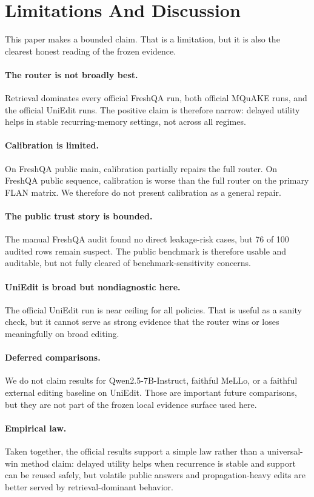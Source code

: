 \section{Limitations And Discussion}

This paper makes a bounded claim. That is a limitation, but it is also the clearest honest reading of the frozen evidence.

\paragraph{The router is not broadly best.}
Retrieval dominates every official FreshQA run, both official MQuAKE runs, and the official UniEdit runs. The positive claim is therefore narrow: delayed utility helps in stable recurring-memory settings, not across all regimes.

\paragraph{Calibration is limited.}
On FreshQA public main, calibration partially repairs the full router. On FreshQA public sequence, calibration is worse than the full router on the primary FLAN matrix. We therefore do not present calibration as a general repair.

\paragraph{The public trust story is bounded.}
The manual FreshQA audit found no direct leakage-risk cases, but 76 of 100 audited rows remain suspect. The public benchmark is therefore usable and auditable, but not fully cleared of benchmark-sensitivity concerns.

\paragraph{UniEdit is broad but nondiagnostic here.}
The official UniEdit run is near ceiling for all policies. That is useful as a sanity check, but it cannot serve as strong evidence that the router wins or loses meaningfully on broad editing.

\paragraph{Deferred comparisons.}
We do not claim results for Qwen2.5-7B-Instruct, faithful MeLLo, or a faithful external editing baseline on UniEdit. Those are important future comparisons, but they are not part of the frozen local evidence surface used here.

\paragraph{Empirical law.}
Taken together, the official results support a simple law rather than a universal-win method claim: delayed utility helps when recurrence is stable and support can be reused safely, but volatile public answers and propagation-heavy edits are better served by retrieval-dominant behavior.
